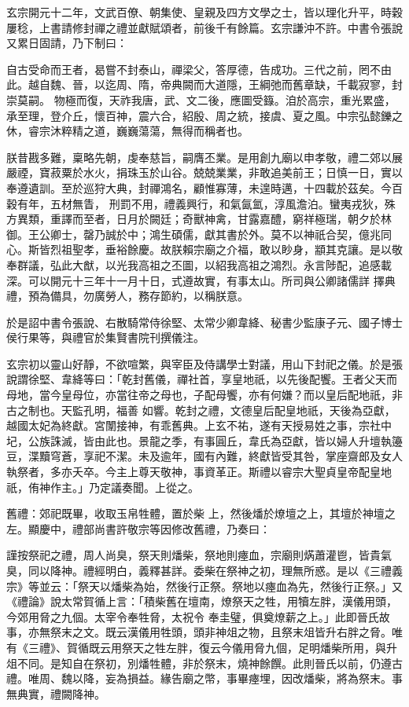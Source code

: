 \begin{pinyinscope}
 玄宗開元十二年，文武百僚、朝集使、皇親及四方文學之士，皆以理化升平，時穀屢稔，上書請修封禪之禮並獻賦頌者，前後千有餘篇。玄宗謙沖不許。中書令張說又累日固請，乃下制曰：



 自古受命而王者，曷嘗不封泰山，禪梁父，答厚德，告成功。三代之前，罔不由此。越自魏、晉，以迄周、隋，帝典闕而大道隱，王綱弛而舊章缺，千載寂寥，封崇莫嗣。
 物極而復，天祚我唐，武、文二後，應圖受籙。洎於高宗，重光累盛，承至理，登介丘，懷百神，震六合，紹殷、周之統，接虞、夏之風。中宗弘懿鑠之休，睿宗沐粹精之道，巍巍蕩蕩，無得而稱者也。



 朕昔戡多難，稟略先朝，虔奉慈旨，嗣膺丕業。是用創九廟以申孝敬，禮二郊以展嚴禋，寶菽粟於水火，捐珠玉於山谷。兢兢業業，非敢追美前王；日慎一日，實以奉遵遺訓。至於巡狩大典，封禪鴻名，顧惟寡薄，未遑時邁，十四載於茲矣。今百穀有年，五材無眚，
 刑罰不用，禮義興行，和氣氤氳，淳風澹泊。蠻夷戎狄，殊方異類，重譯而至者，日月於闕廷；奇獸神禽，甘露嘉醴，窮祥極瑞，朝夕於林御。王公卿士，罄乃誠於中；鴻生碩儒，獻其書於外。莫不以神祇合契，億兆同心。斯皆烈祖聖孝，垂裕餘慶。故朕賴宗廟之介福，敢以眇身，顓其克讓。是以敬奉群議，弘此大猷，以光我高祖之丕圖，以紹我高祖之鴻烈。永言陟配，追感載深。可以開元十三年十一月十日，式遵故實，有事太山。所司與公卿諸儒詳
 擇典禮，預為備具，勿廣勞人，務存節約，以稱朕意。



 於是詔中書令張說、右散騎常侍徐堅、太常少卿韋絳、秘書少監康子元、國子博士侯行果等，與禮官於集賢書院刊撰儀注。



 玄宗初以靈山好靜，不欲喧繁，與宰臣及侍講學士對議，用山下封祀之儀。於是張說謂徐堅、韋絳等曰：「乾封舊儀，禪社首，享皇地祇，以先後配饗。王者父天而母地，當今皇母位，亦當往帝之母也，子配母饗，亦有何嫌？而以皇后配地祇，非古之制也。天監孔明，福善
 如響。乾封之禮，文德皇后配皇地祇，天後為亞獻，越國太妃為終獻。宮闈接神，有乖舊典。上玄不祐，遂有天授易姓之事，宗社中圮，公族誅滅，皆由此也。景龍之季，有事圓丘，韋氏為亞獻，皆以婦人升壇執籩豆，渫黷穹蒼，享祀不潔。未及逾年，國有內難，終獻皆受其咎，掌座齋郎及女人執祭者，多亦夭卒。今主上尊天敬神，事資革正。斯禮以睿宗大聖貞皇帝配皇地祇，侑神作主。」乃定議奏聞。上從之。



 舊禮：郊祀既畢，收取玉帛牲體，置於柴
 上，然後燔於燎壇之上，其壇於神壇之左。顯慶中，禮部尚書許敬宗等因修改舊禮，乃奏曰：



 謹按祭祀之禮，周人尚臭，祭天則燔柴，祭地則瘞血，宗廟則焫蕭灌鬯，皆貴氣臭，同以降神。禮經明白，義釋甚詳。委柴在祭神之初，理無所惑。是以《三禮義宗》等並云：「祭天以燔柴為始，然後行正祭。祭地以瘞血為先，然後行正祭。」又《禮論》說太常賀循上言：「積柴舊在壇南，燎祭天之牲，用犢左胖，漢儀用頭，今郊用脅之九個。太宰令奉牲脅，太祝令
 奉圭璧，俱奠燎薪之上。」此即晉氏故事，亦無祭末之文。既云漢儀用牲頭，頭非神俎之物，且祭末俎皆升右胖之脅。唯有《三禮》、賀循既云用祭天之牲左胖，復云今儀用脅九個，足明燔柴所用，與升俎不同。是知自在祭初，別燔牲體，非於祭末，燒神餘饌。此則晉氏以前，仍遵古禮。唯周、魏以降，妄為損益。緣告廟之幣，事畢瘞埋，因改燔柴，將為祭末。事無典實，禮闕降神。




\end{pinyinscope}
